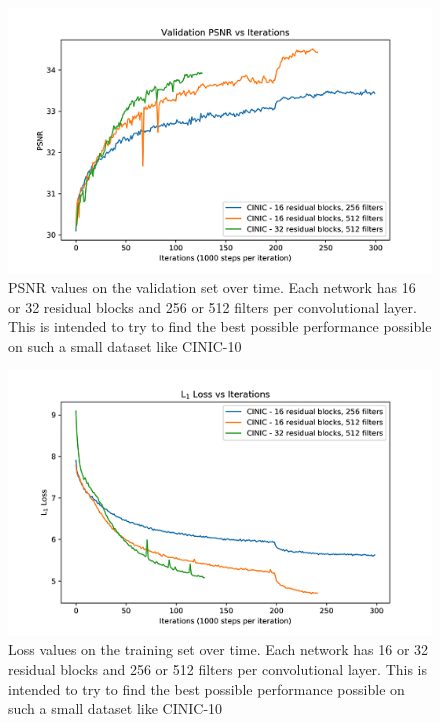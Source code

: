 \documentclass[conference]{IEEEtran}
\begin{document}
\begin{figure}[htbp]
  \centerline{\includegraphics{filt-psnr.png}}
  \caption{PSNR values on the validation set over time. Each network has 16 or 32 residual blocks and 256 or 512 filters per convolutional layer. This is intended to try to find the best possible performance possible on such a small dataset like CINIC-10}
  \label{fig:filt-psnr}
\end{figure}

\begin{figure}[htbp]
  \centerline{\includegraphics{filt-loss.png}}
  \caption{Loss values on the training set over time. Each network has 16 or 32 residual blocks and 256 or 512 filters per convolutional layer. This is intended to try to find the best possible performance possible on such a small dataset like CINIC-10}
  \label{fig:filt-loss}
\end{figure}
\end{document}
